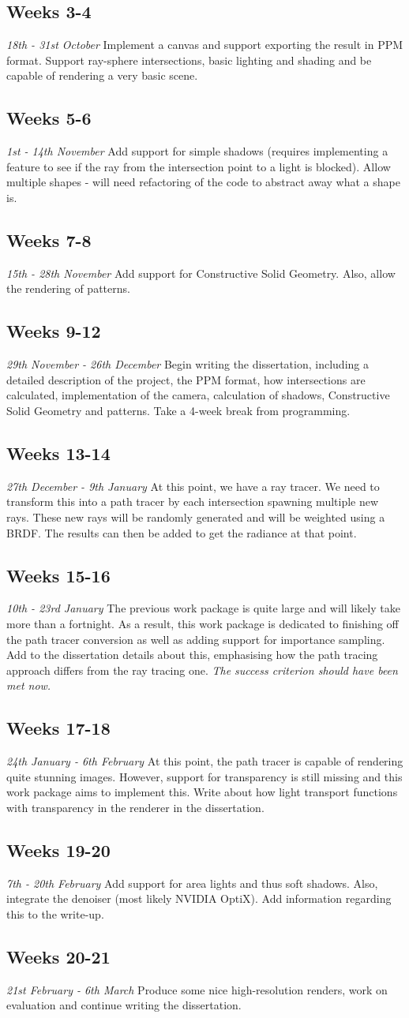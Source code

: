 \documentclass[12pt, a4paper]{article}
\newcommand{\newtime}[3]{
    \subsection*{#1}
    \vspace{-\baselineskip}
    \emph{#2}
    \vspace{\baselineskip}
    \newline
    #3
}
\begin{document}
    \newtime{Weeks 3-4}{18th - 31st October}{Implement a canvas and support exporting the result in PPM format. Support ray-sphere intersections, basic lighting and shading and be capable of rendering a very basic scene.}

    \newtime{Weeks 5-6}{1st - 14th November}{Add support for simple shadows (requires implementing a feature to see if the ray from the intersection point to a light is blocked). Allow multiple shapes - will need refactoring of the code to abstract away what a shape is.}

    \newtime{Weeks 7-8}{15th - 28th November}{Add support for Constructive Solid Geometry. Also, allow the rendering of patterns.}

    \newtime{Weeks 9-12}{29th November - 26th December}{Begin writing the dissertation, including a detailed description of the project, the PPM format, how intersections are calculated, implementation of the camera, calculation of shadows, Constructive Solid Geometry and patterns. Take a 4-week break from programming.}

    \newtime{Weeks 13-14}{27th December - 9th January}{At this point, we have a ray tracer. We need to transform this into a path tracer by each intersection spawning multiple new rays. These new rays will be randomly generated and will be weighted using a BRDF. The results can then be added to get the radiance at that point.}

    \newtime{Weeks 15-16}{10th - 23rd January}{The previous work package is quite large and will likely take more than a fortnight. As a result, this work package is dedicated to finishing off the path tracer conversion as well as adding support for importance sampling. Add to the dissertation details about this, emphasising how the path tracing approach differs from the ray tracing one. \emph{The success criterion should have been met now.}}

    \newtime{Weeks 17-18}{24th January - 6th February}{At this point, the path tracer is capable of rendering quite stunning images. However, support for transparency is still missing and this work package aims to implement this. Write about how light transport functions with transparency in the renderer in the dissertation.}

    \newtime{Weeks 19-20}{7th - 20th February}{Add support for area lights and thus soft shadows. Also, integrate the denoiser (most likely NVIDIA OptiX). Add information regarding this to the write-up.}

    \newtime{Weeks 20-21}{21st February - 6th March}{Produce some nice high-resolution renders, work on evaluation and continue writing the dissertation.}
\end{document}

